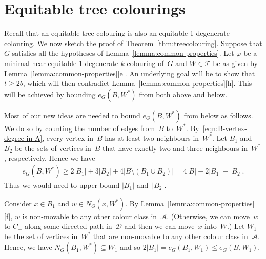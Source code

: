 \documentclass[11pt]{article}
\theoremstyle{plain}
\numberwithin{equation}{section}
\begin{document}
\section{Equitable tree colourings}\label{sec:proof1}



Recall that an equitable tree colouring is also an equitable 1-degenerate colouring. We now sketch the proof of Theorem~\ref{thm:treecolouring}.
Suppose that $G$ satisfies all the hypotheses of Lemma~\ref{lemma:common-properties}.
Let $\varphi$ be a minimal near-equitable $1$-degenerate $k$-colouring of~$G$ and
$W \in \mathcal{T}$ be as given by Lemma~\ref{lemma:common-properties}\ref{e}.
An underlying goal will be to show that $t \ge 2b$, which will then contradict Lemma~\ref{lemma:common-properties}\ref{h}.
This will be achieved by bounding $e_G(B,W^*)$ from both above and below.

Most of our new ideas are needed to bound $e_G(B,W^*)$ from below as follows.
We do so by counting the number of edges from~$B$ to~$W^*$.
By~\eqref{eqn:B-vertex-degree-in-A}, every vertex in~$B$ has at least two neighbours in~$W^*$.
Let $B_1$ and $B_2$ be the sets of vertices in~$B$ that have exactly two and three neighbours in~$W^*$, respectively.
Hence we have
\begin{align*}
	e_G(B,W^*) \ge 2 |B_1| + 3 |B_2| + 4 |B \setminus (B_1 \cup B_2)| = 4|B| - 2|B_1| - |B_2|.
\end{align*}
Thus we would need to upper bound $|B_1|$ and~$|B_2|$.

Consider $x \in B_1$ and $w \in N_G(x,W^*)$.
By Lemma~\ref{lemma:common-properties}\ref{f}, $w$ is non-movable to any other colour class in~$\mathcal{A}$.
(Otherwise, we can move~$w$ to $C_-$ along some directed path in~$\mathcal{D}$ and then we can move~$x$ into~$W$.)
Let $W_1$ be the set of vertices in~$W^*$ that are non-movable to any other colour class in~$\mathcal{A}$.
Hence, we have $N_G(B_1, W^*) \subseteq W_1$ and so $2|B_1| = e_G(B_1,W_1) \le e_G(B,W_1)$.
\end{document}
